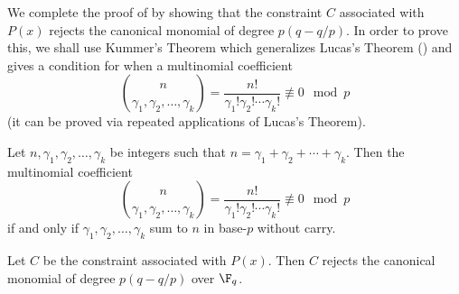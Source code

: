 We complete the proof of  by showing that the constraint $C$ associated with $P(x)$ rejects the canonical
monomial of degree $p(q-q/p)$. In order to prove this, we shall use Kummer's Theorem which generalizes Lucas's Theorem () and
gives a condition for when a multinomial coefficient
\[
\binom  {n}  {\gamma_1, \gamma_2,\ldots, \gamma_k} =
\frac {n!} {\gamma_1! \gamma_2! \cdots \gamma_k!} \not \equiv 0 \mod
p
\]
(it can be proved via repeated applications of Lucas's Theorem).


\begin{theorem}
Let $n, \gamma_1,\gamma_2,\ldots,\gamma_k$ be integers such that $n = \gamma_1 + \gamma_2 + \cdots + \gamma_k$.
Then the multinomial coefficient 
\[
\binom {n}  {\gamma_1, \gamma_2,\ldots, \gamma_k} =
\frac {n!} {\gamma_1! \gamma_2 ! \cdots \gamma_k!} \not \equiv 0 \mod
p
\]
if and only if $\gamma_1, \gamma_2 , \ldots, \gamma_k$ sum
to $n$ in base-$p$ without carry.
\end{theorem}

\begin{lemma}\label{lem:tech-lem-reject}
Let $C$ be the constraint associated with $P(x)$. Then $C$ rejects the canonical monomial of degree $p(q-q/p)$ over $\F_q$.
\end{lemma}


